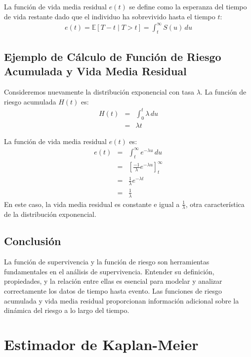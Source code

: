 \documentclass[a4paper]{report} %
\begin{document}
La funci\'on de vida media residual $e(t)$ se define como la esperanza del tiempo de vida restante dado que el individuo ha sobrevivido hasta el tiempo $t$:
\begin{eqnarray*}
e(t) = \mathbb{E}[T - t \mid T > t] = \int_t^\infty S(u) \, du
\end{eqnarray*}

\section{Ejemplo de C\'alculo de Funci\'on de Riesgo Acumulada y Vida Media Residual}
Consideremos nuevamente la distribuci\'on exponencial con tasa $\lambda$. La funci\'on de riesgo acumulada $H(t)$ es:
\begin{eqnarray*}
H(t) &=& \int_0^t \lambda \, du \\
     &=& \lambda t
\end{eqnarray*}

La funci\'on de vida media residual $e(t)$ es:
\begin{eqnarray*}
e(t) &=& \int_t^\infty e^{-\lambda u} \, du \\
     &=& \left[ \frac{-1}{\lambda} e^{-\lambda u} \right]_t^\infty \\
     &=& \frac{1}{\lambda} e^{-\lambda t} \\
     &=& \frac{1}{\lambda}
\end{eqnarray*}
En este caso, la vida media residual es constante e igual a $\frac{1}{\lambda}$, otra caracter\'istica de la distribuci\'on exponencial.

\section{Conclusi\'on}
La funci\'on de supervivencia y la funci\'on de riesgo son herramientas fundamentales en el an\'alisis de supervivencia. Entender su definici\'on, propiedades, y la relaci\'on entre ellas es esencial para modelar y analizar correctamente los datos de tiempo hasta evento. Las funciones de riesgo acumulada y vida media residual proporcionan informaci\'on adicional sobre la din\'amica del riesgo a lo largo del tiempo.


\chapter{Estimador de Kaplan-Meier}
\end{document}
